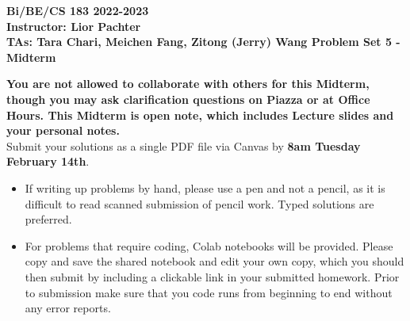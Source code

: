 \documentclass[11pt]{exam}
\begin{document}
\begin{center}

     \textbf{Bi/BE/CS 183 2022-2023\\ Instructor: Lior Pachter\\ TAs: Tara Chari, Meichen Fang, Zitong (Jerry) Wang \vskip 0.15in Problem Set 5 - Midterm}

\end{center}
\textbf{You are not allowed to collaborate with others for this Midterm, though you may ask clarification questions on Piazza or at Office Hours. This Midterm is open note, which includes Lecture slides and your personal notes.} \\

Submit your solutions as a single PDF file via Canvas by {\bf 8am Tuesday February 14th}. 
\begin{itemize}
  \item If writing up problems by hand, please use a pen and not a pencil, as it is difficult to read scanned submission of pencil work. Typed solutions are preferred.
  \item For problems that require coding, Colab notebooks will be provided. Please copy and save the shared notebook and edit your own copy, which you should then submit by including a clickable link in your submitted homework. Prior to submission make sure that you code runs from beginning to end without any error reports.
  \end{itemize}
  
  
  
\end{document}
